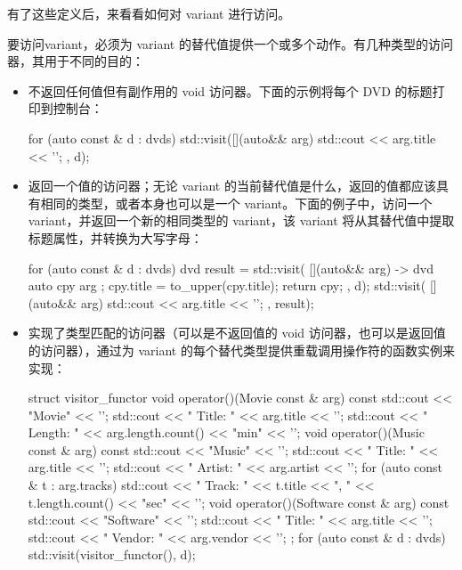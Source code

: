 有了这些定义后，来看看如何对 variant 进行访问。


要访问variant，必须为 variant 的替代值提供一个或多个动作。有几种类型的访问器，其用于不同的目的：

\begin{itemize}
\item
不返回任何值但有副作用的 void 访问器。下面的示例将每个 DVD 的标题打印到控制台：

\begin{cpp}
for (auto const & d : dvds)
{
    std::visit([](auto&& arg) {
                std::cout << arg.title << '\n'; },
            d);
}
\end{cpp}

\item
返回一个值的访问器；无论 variant 的当前替代值是什么，返回的值都应该具有相同的类型，或者本身也可以是一个 variant。下面的例子中，访问一个 variant，并返回一个新的相同类型的 variant，该 variant 将从其替代值中提取标题属性，并转换为大写字母：

\begin{cpp}
for (auto const & d : dvds)
{
    dvd result = std::visit(
        [](auto&& arg) -> dvd
        {
            auto cpy { arg };
            cpy.title = to_upper(cpy.title);
            return cpy;
        },
    d);
    std::visit(
        [](auto&& arg) {
            std::cout << arg.title << '\n'; },
        result);
}
\end{cpp}

\item
实现了类型匹配的访问器（可以是不返回值的 void 访问器，也可以是返回值的访问器），通过为 variant 的每个替代类型提供重载调用操作符的函数实例来实现：

\begin{cpp}
struct visitor_functor
{
    void operator()(Movie const & arg) const
    {
        std::cout << "Movie" << '\n';
        std::cout << " Title: " << arg.title << '\n';
        std::cout << " Length: " << arg.length.count()
                  << "min" << '\n';
    }
    void operator()(Music const & arg) const
    {
        std::cout << "Music" << '\n';
        std::cout << " Title: " << arg.title << '\n';
        std::cout << " Artist: " << arg.artist << '\n';
        for (auto const & t : arg.tracks)
        std::cout << " Track: " << t.title
                  << ", " << t.length.count()
                  << "sec" << '\n';
    }
    void operator()(Software const & arg) const
    {
        std::cout << "Software" << '\n';
        std::cout << " Title: " << arg.title << '\n';
        std::cout << " Vendor: " << arg.vendor << '\n';
    }
};
for (auto const & d : dvds)
{
    std::visit(visitor_functor(), d);
}
\end{cpp}


\end{itemize}
